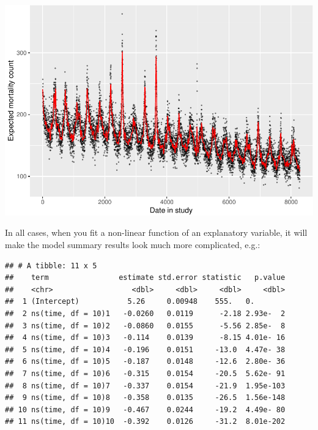 \documentclass[
]{book}
\newenvironment{Shaded}{\begin{snugshade}}{\end{snugshade}}
\newcommand{\KeywordTok}[1]{\textcolor[rgb]{0.13,0.29,0.53}{\textbf{#1}}}
\newcommand{\NormalTok}[1]{#1}
\newcommand{\OperatorTok}[1]{\textcolor[rgb]{0.81,0.36,0.00}{\textbf{#1}}}
\newcommand{\StringTok}[1]{\textcolor[rgb]{0.31,0.60,0.02}{#1}}
\begin{document}
\includegraphics{adv_epi_analysis_files/figure-latex/unnamed-chunk-54-1.pdf}

In all cases, when you fit a non-linear function of an explanatory variable,
it will make the model summary results look much more complicated, e.g.:

\begin{Shaded}
\end{Shaded}

\begin{verbatim}
## # A tibble: 11 x 5
##    term                estimate std.error statistic   p.value
##    <chr>                  <dbl>     <dbl>     <dbl>     <dbl>
##  1 (Intercept)           5.26     0.00948    555.   0.       
##  2 ns(time, df = 10)1   -0.0260   0.0119      -2.18 2.93e-  2
##  3 ns(time, df = 10)2   -0.0860   0.0155      -5.56 2.85e-  8
##  4 ns(time, df = 10)3   -0.114    0.0139      -8.15 4.01e- 16
##  5 ns(time, df = 10)4   -0.196    0.0151     -13.0  4.47e- 38
##  6 ns(time, df = 10)5   -0.187    0.0148     -12.6  2.80e- 36
##  7 ns(time, df = 10)6   -0.315    0.0154     -20.5  5.62e- 91
##  8 ns(time, df = 10)7   -0.337    0.0154     -21.9  1.95e-103
##  9 ns(time, df = 10)8   -0.358    0.0135     -26.5  1.56e-148
## 10 ns(time, df = 10)9   -0.467    0.0244     -19.2  4.49e- 80
## 11 ns(time, df = 10)10  -0.392    0.0126     -31.2  8.01e-202
\end{verbatim}
\end{document}
